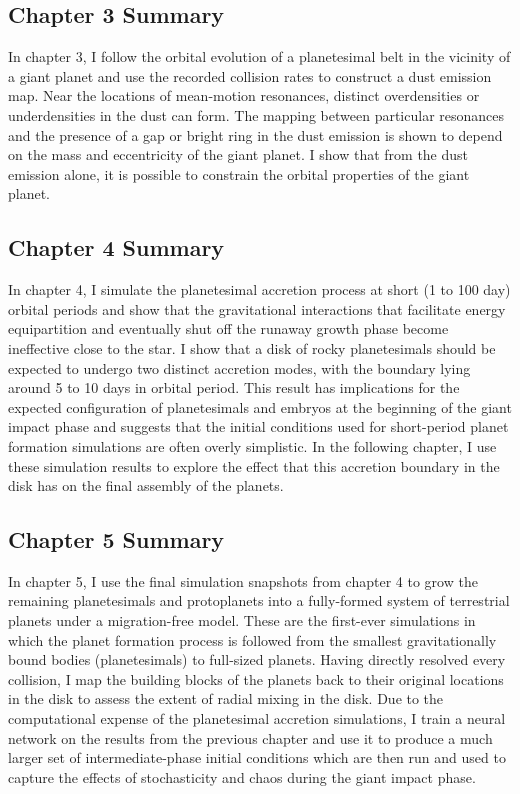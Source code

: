 \subsection{Chapter 3 Summary}

In chapter 3, I follow the orbital evolution of a planetesimal belt in the vicinity of a giant planet and use the recorded collision rates to construct a dust emission map. Near the locations of mean-motion resonances, distinct overdensities or underdensities in the dust can form. The mapping between particular resonances and the presence of a gap or bright ring in the dust emission is shown to depend on the mass and eccentricity of the giant planet. I show that from the dust emission alone, it is possible to constrain the orbital properties of the giant planet.

\subsection{Chapter 4 Summary}

In chapter 4, I simulate the planetesimal accretion process at short (1 to 100 day) orbital periods and show that the gravitational interactions that facilitate energy equipartition and eventually shut off the runaway growth phase become ineffective close to the star. I show that a disk of rocky planetesimals should be expected to undergo two distinct accretion modes, with the boundary lying around 5 to 10 days in orbital period. This result has implications for the expected configuration of planetesimals and embryos at the beginning of the giant impact phase and suggests that the initial conditions used for short-period planet formation simulations are often overly simplistic. In the following chapter, I use these simulation results to explore the effect that this accretion boundary in the disk has on the final assembly of the planets.

\subsection{Chapter 5 Summary}

In chapter 5, I use the final simulation snapshots from chapter 4 to grow the remaining planetesimals and protoplanets into a fully-formed system of terrestrial planets under a migration-free model. These are the first-ever simulations in which the planet formation process is followed from the smallest gravitationally bound bodies (planetesimals) to full-sized planets. Having directly resolved every collision, I map the building blocks of the planets back to their original locations in the disk to assess the extent of radial mixing in the disk. Due to the computational expense of the planetesimal accretion simulations, I train a neural network on the results from the previous chapter and use it to produce a much larger set of intermediate-phase initial conditions which are then run and used to capture the effects of stochasticity and chaos during the giant impact phase.
